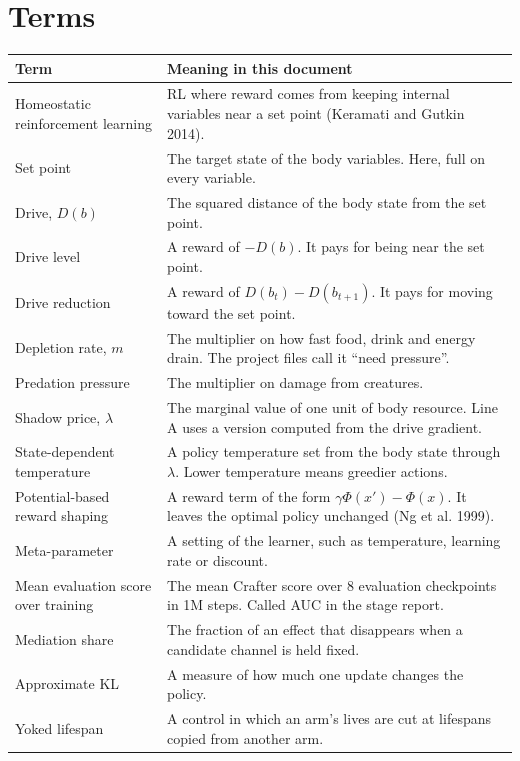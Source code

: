 \documentclass[11pt]{article}
\begin{document}
\section{Terms}

\begin{tabularx}{\textwidth}{@{}>{\raggedright\arraybackslash}p{}X@{}}
\toprule
\textbf{Term} & \textbf{Meaning in this document} \\
\midrule
Homeostatic reinforcement learning & RL where reward comes from keeping internal variables near a set point (Keramati and Gutkin 2014). \\
Set point & The target state of the body variables. Here, full on every variable. \\
Drive, $D(b)$ & The squared distance of the body state from the set point. \\
Drive level & A reward of $-D(b)$. It pays for being near the set point. \\
Drive reduction & A reward of $D(b_t) - D(b_{t+1})$. It pays for moving toward the set point. \\
Depletion rate, $m$ & The multiplier on how fast food, drink and energy drain. The project files call it ``need pressure''. \\
Predation pressure & The multiplier on damage from creatures. \\
Shadow price, $\lambda$ & The marginal value of one unit of body resource. Line A uses a version computed from the drive gradient. \\
State-dependent temperature & A policy temperature set from the body state through $\lambda$. Lower temperature means greedier actions. \\
Potential-based reward shaping & A reward term of the form $\gamma\Phi(x') - \Phi(x)$. It leaves the optimal policy unchanged (Ng et al. 1999). \\
Meta-parameter & A setting of the learner, such as temperature, learning rate or discount. \\
Mean evaluation score over training & The mean Crafter score over 8 evaluation checkpoints in 1M steps. Called AUC in the stage report. \\
Mediation share & The fraction of an effect that disappears when a candidate channel is held fixed. \\
Approximate KL & A measure of how much one update changes the policy. \\
Yoked lifespan & A control in which an arm's lives are cut at lifespans copied from another arm. \\

\end{tabularx}
\end{document}
